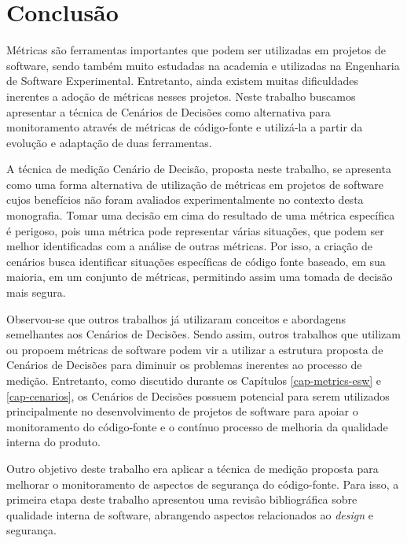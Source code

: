 \chapter{Conclusão}
\label{cap-consideracoesFinais}

Métricas são ferramentas importantes que podem ser utilizadas em projetos de software, sendo também muito estudadas na academia e utilizadas na Engenharia de Software Experimental. Entretanto, ainda existem muitas dificuldades inerentes a adoção de métricas nesses projetos. Neste trabalho buscamos apresentar a técnica de Cenários de Decisões como alternativa para monitoramento através de métricas de código-fonte e utilizá-la a partir da evolução e adaptação de duas ferramentas.

%

A técnica de medição Cenário de Decisão, proposta neste trabalho, se apresenta como uma forma alternativa de utilização de métricas em projetos de software cujos benefícios não foram avaliados experimentalmente no contexto desta monografia.  Tomar uma decisão em cima do resultado de uma métrica específica é perigoso, pois uma métrica pode representar várias situações, que podem ser melhor identificadas com a análise de outras métricas. Por isso, a criação de cenários busca identificar situações específicas de código fonte baseado, em sua maioria, em um conjunto de métricas, permitindo assim uma tomada de decisão mais segura. 

%

Observou-se que outros trabalhos já utilizaram conceitos e abordagens semelhantes aos Cenários de Decisões. Sendo assim, outros trabalhos que utilizam ou propoem  métricas de software podem vir a utilizar a estrutura proposta de Cenários de Decisões para diminuir os problemas inerentes ao processo de medição. Entretanto, como discutido durante os Capítulos \ref{cap-metrics-esw} e \ref{cap-cenarios}, os   Cenários de Decisões possuem potencial para serem utilizados principalmente no desenvolvimento de projetos de software para apoiar o monitoramento do código-fonte e o contínuo processo de melhoria da qualidade interna do produto. 

%

Outro objetivo deste trabalho era aplicar a técnica de medição proposta para melhorar o monitoramento de aspectos de segurança do código-fonte. Para isso, a primeira etapa deste trabalho apresentou uma revisão bibliográfica sobre qualidade interna de software, abrangendo aspectos relacionados ao \emph{design} e segurança. 

